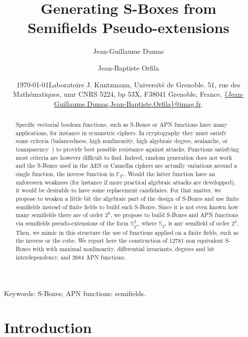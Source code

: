 \documentclass{article}\usepackage{amsthm}
\date{\today}
\title{Generating S-Boxes from Semifields Pseudo-extensions}
\author{Jean-Guillaume Dumas \and Jean-Baptiste Orfila}
\date{\small Laboratoire J. Kuntzmann, Universit\'e de Grenoble. 51, rue des
  Math\'ematiques, umr CNRS 5224, bp 53X, F38041 Grenoble, France,
\href{mailto:Jean-Guillaume.Dumas@imag.fr,Jean-Baptiste.Orfila@imag.fr}{\{Jean-Guillaume.Dumas,Jean-Baptiste.Orfila\}@imag.fr}.
}
\newcommand{\F}{{\mathbb F}}
\newcommand{\Sf}{{\mathbb S}}
\newcommand{\SBoxes}{S-Boxes\xspace}
\begin{document}
\maketitle












\begin{abstract}
  Specific vectorial boolean functions, such as \SBoxes or APN functions have many
applications, for instance in symmetric ciphers. 
In cryptography they must satisfy some criteria (balancedness, high
nonlinearity, high algebraic degree, avalanche, or
transparency~\cite{Alvarez:2008:apn,Prouff:2005:transparency}) to provide best
possible resistance against attacks.
Functions satisfying most criteria are however difficult to find. 
Indeed, random generation does not
work~\cite{Danjean:2007:pasco,Hussain:2012:chaotic} and the \SBoxes used in the AES
or Camellia ciphers are actually variations around a single function, the inverse
function in $\F_{2^n}$. Would the latter function have an unforeseen weakness (for instance if more
practical algebraic attacks are developped), it would be desirable to have some
replacement candidates. For that matter, we propose to weaken a little bit the algebraic part of the
design of \SBoxes and use finite semifields instead of finite fields to build
such \SBoxes. Since it is not even known how
many semifields there are of order $2^8$, we propose
to build \SBoxes and APN functions via semifields pseudo-extensions of the form $\Sf^2_{2^4}$,
where $\Sf_{2^4}$ is any semifield of order $2^4$. Then, we mimic in this
structure the use of functions applied on a finite fields, such as the inverse or
the cube. We report here the construction of $12781$ non equivalent \SBoxes with with maximal nonlinearity, differential invariants, degrees
 and bit interdependency, and $2684$ APN functions.

\end{abstract}


Keywords: \SBoxes; APN functions; semifields.
\section{Introduction}
\end{document}
